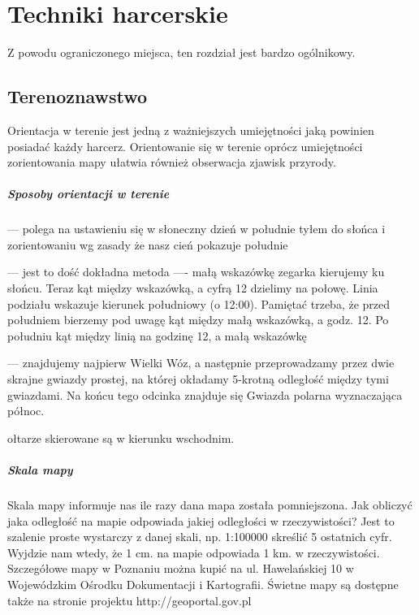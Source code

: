 \chapter{Techniki harcerskie}
Z powodu ograniczonego miejsca, ten rozdział jest bardzo ogólnikowy.
\section{Terenoznawstwo}

Orientacja w terenie jest jedną z ważniejszych umiejętności jaką powinien posiadać każdy harcerz. Orientowanie się w terenie oprócz umiejętności zorientowania mapy ułatwia również obserwacja zjawisk przyrody. 
\paragraph{Sposoby orientacji w terenie}
\begin{description} 

\item[Według położenia słońca] --- polega na ustawieniu się w słoneczny dzień w południe tyłem do słońca i zorientowaniu wg zasady że nasz cień pokazuje południe
\item[Według słońca i zegarka] --- jest to dość dokładna metoda ---- małą wskazówkę zegarka kierujemy ku słońcu. 
Teraz kąt między wskazówką, a cyfrą 12 dzielimy na połowę. Linia podziału wskazuje kierunek południowy (o 12:00). 
Pamiętać trzeba, że przed południem bierzemy pod uwagę kąt między małą wskazówką, a godz. 12. Po południu kąt między linią na godzinę 12, a małą wskazówkę
\item[Według gwiazdy polarnej] --- znajdujemy najpierw Wielki Wóz, a następnie przeprowadzamy przez dwie skrajne gwiazdy prostej, na której okładamy 5-krotną odległość między tymi gwiazdami. 
Na końcu tego odcinka znajduje się Gwiazda polarna wyznaczająca północ.
\item[W starych kościołach] ołtarze skierowane są w kierunku wschodnim.

\end{description}
\paragraph{Skala mapy}

Skala mapy informuje nas ile razy dana mapa została pomniejszona. Jak obliczyć jaka odległość na mapie odpowiada jakiej odległości w rzeczywistości? Jest to szalenie proste wystarczy z danej skali, np. 1:100000 skreślić 5 ostatnich cyfr. Wyjdzie nam wtedy, że 1 cm. na mapie odpowiada 1 km. w rzeczywistości. Szczegółowe mapy w Poznaniu można kupić na ul. Hawelańskiej 10 w Wojewódzkim Ośrodku Dokumentacji i Kartografii. Świetne mapy są dostępne także na stronie projektu http://geoportal.gov.pl

